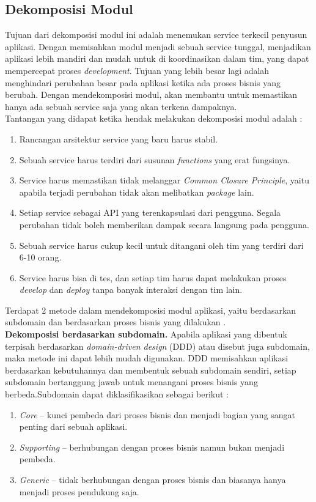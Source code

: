 \subsection{Dekomposisi Modul}
Tujuan dari dekomposisi modul ini adalah menemukan service terkecil penyusun aplikasi. Dengan memisahkan modul menjadi sebuah service tunggal, menjadikan aplikasi lebih mandiri dan mudah untuk di koordinasikan dalam tim, yang dapat mempercepat proses \textit{development}. Tujuan yang lebih besar lagi adalah menghindari perubahan besar pada aplikasi ketika ada proses bisnis yang berubah. Dengan mendekomposisi modul, akan membantu untuk memastikan hanya ada sebuah service saja yang akan terkena dampaknya.\\
Tantangan yang didapat ketika hendak melakukan dekomposisi modul adalah :
\begin{enumerate}[leftmargin=*]
	\item Rancangan arsitektur service yang baru harus stabil.
	\item Sebuah service harus terdiri dari susunan \textit{functions} yang erat fungsinya.
	\item Service harus memastikan tidak melanggar \textit{Common Closure Principle}, yaitu apabila terjadi perubahan tidak akan melibatkan \textit{package} lain.
	\item Setiap service sebagai API yang terenkapsulasi dari pengguna. Segala perubahan tidak boleh memberikan dampak secara langsung pada pengguna.
	\item Sebuah service harus cukup kecil untuk ditangani oleh tim yang terdiri dari 6-10 orang.
	\item Service harus bisa di tes, dan setiap tim harus dapat melakukan proses \textit{develop} dan \textit{deploy} tanpa banyak interaksi dengan tim lain.
\end{enumerate}
Terdapat 2 metode dalam mendekomposisi modul aplikasi, yaitu berdasarkan subdomain dan berdasarkan proses bisnis yang dilakukan \cite{6}.\\
\textbf{Dekomposisi berdasarkan subdomain.} Apabila aplikasi yang dibentuk terpisah berdasarkan \textit{domain-driven design} (DDD) atau disebut juga subdomain, maka metode ini dapat lebih mudah digunakan. DDD memisahkan aplikasi berdasarkan kebutuhannya dan membentuk sebuah subdomain sendiri, setiap subdomain bertanggung jawab untuk menangani proses bisnis yang berbeda.Subdomain dapat diklasifikasikan sebagai berikut :
\begin{enumerate}[leftmargin=*]
	\item \textit{Core} – kunci pembeda dari proses bisnis dan menjadi bagian yang sangat penting dari sebuah aplikasi.
	\item \textit{Supporting} – berhubungan dengan proses bisnis namun bukan menjadi pembeda.
	\item \textit{Generic} – tidak berhubungan dengan proses bisnis dan biasanya hanya menjadi proses pendukung saja.
\end{enumerate}
